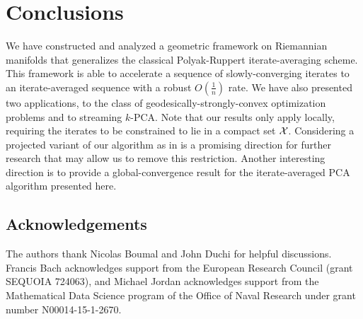 \section{Conclusions}
\vspace{-3.22pt}
We have constructed and analyzed a geometric framework on Riemannian manifolds that generalizes the classical Polyak-Ruppert iterate-averaging scheme.  This framework is able to accelerate a sequence of slowly-converging iterates to an iterate-averaged sequence with a robust $O(\frac{1}{n})$ rate. We have also presented two applications, to the class of geodesically-strongly-convex optimization problems and to streaming $k$-PCA.
Note that our results only apply locally, requiring the iterates to be constrained to lie in a compact set $\mathcal{X}$. Considering a projected variant of our algorithm as in \citet{FlaBac17} is a promising direction for further research that may allow us to remove this restriction. Another interesting direction is to provide a global-convergence result for the iterate-averaged PCA algorithm presented here.


\subsection*{Acknowledgements}
The authors thank Nicolas Boumal and John Duchi for helpful discussions. Francis Bach acknowledges support from the European Research Council (grant SEQUOIA 724063), and Michael Jordan acknowledges support from the Mathematical Data Science program of the Office of Naval Research under grant number N00014-15-1-2670. 